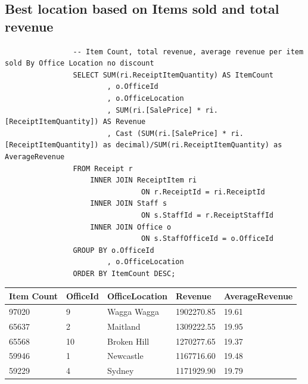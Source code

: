 \documentclass{article}
\begin{document}
             
            
            \subsection{Best location based on Items sold and total revenue}
               
                \begin{lstlisting}
				-- Item Count, total revenue, average revenue per item sold By Office Location no discount
				SELECT SUM(ri.ReceiptItemQuantity) AS ItemCount
						, o.OfficeId
						, o.OfficeLocation
						, SUM(ri.[SalePrice] * ri.[ReceiptItemQuantity]) AS Revenue
						, Cast (SUM(ri.[SalePrice] * ri.[ReceiptItemQuantity]) as decimal)/SUM(ri.ReceiptItemQuantity) as AverageRevenue
				FROM Receipt r
					INNER JOIN ReceiptItem ri
								ON r.ReceiptId = ri.ReceiptId
					INNER JOIN Staff s
								ON s.StaffId = r.ReceiptStaffId
					INNER JOIN Office o
								ON s.StaffOfficeId = o.OfficeId
				GROUP BY o.OfficeId
						, o.OfficeLocation
				ORDER BY ItemCount DESC;
                \end{lstlisting}

                \begin{table}[H]
                    \centering
                    \begin{tabular}{|l|l|l|l|l|}
                    \hline
                    Item Count & OfficeId & OfficeLocation & Revenue    & AverageRevenue \\ \hline
                    97020      & 9        & Wagga Wagga    & 1902270.85 & 19.61          \\ \hline
                    65637      & 2        & Maitland       & 1309222.55 & 19.95          \\ \hline
                    65568      & 10       & Broken Hill    & 1270277.65 & 19.37          \\ \hline
                    59946      & 1        & Newcastle      & 1167716.60 & 19.48          \\ \hline
                    59229      & 4        & Sydney         & 1171929.90 & 19.79          \\ \hline
                    \end{tabular}
                    \end{table}
\end{document}
